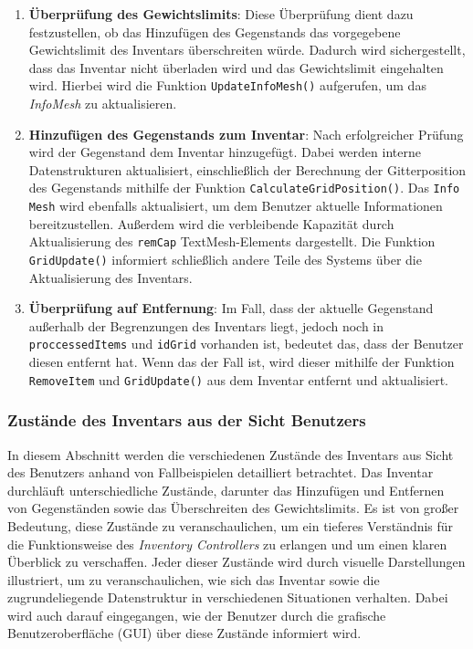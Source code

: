 \begin{enumerate}
    \item \textbf{Überprüfung des Gewichtslimits}:
    Diese Überprüfung dient dazu festzustellen, ob das Hinzufügen des Gegenstands das vorgegebene Gewichtslimit des
    Inventars überschreiten würde. Dadurch wird sichergestellt, dass das Inventar nicht überladen wird und das
    Gewichtslimit eingehalten wird. Hierbei wird die Funktion \texttt{UpdateInfoMesh()} aufgerufen, um das \textit{InfoMesh}
    zu aktualisieren.

    \item \textbf{Hinzufügen des Gegenstands zum Inventar}:
    Nach erfolgreicher Prüfung wird der Gegenstand dem Inventar hinzugefügt. Dabei werden interne Datenstrukturen
    aktualisiert, einschließlich der Berechnung der Gitterposition des Gegenstands mithilfe der Funktion
    \texttt{CalculateGridPosition()}. Das \texttt{Info Mesh} wird ebenfalls aktualisiert, um dem Benutzer aktuelle
    Informationen bereitzustellen. Außerdem wird die verbleibende Kapazität durch Aktualisierung des \texttt{remCap}
    TextMesh-Elements dargestellt. Die Funktion \texttt{GridUpdate()} informiert schließlich andere Teile des Systems
    über die Aktualisierung des Inventars.

    \item \textbf{Überprüfung auf Entfernung}:
    Im Fall, dass der aktuelle Gegenstand außerhalb der Begrenzungen des Inventars liegt, jedoch noch in
    \texttt{proccessedItems} und \texttt{idGrid} vorhanden ist, bedeutet das, dass der Benutzer diesen entfernt
    hat. Wenn das der Fall ist, wird dieser mithilfe der Funktion \texttt{RemoveItem} und \texttt{GridUpdate()} aus
    dem Inventar entfernt und aktualisiert.
\end{enumerate}

\subsubsection{Zustände des Inventars aus der Sicht Benutzers}
In diesem Abschnitt werden die verschiedenen Zustände des Inventars aus Sicht des Benutzers anhand von Fallbeispielen
detailliert betrachtet. Das Inventar durchläuft unterschiedliche Zustände, darunter das Hinzufügen und Entfernen
von Gegenständen sowie das Überschreiten des Gewichtslimits. Es ist von großer Bedeutung, diese Zustände zu
veranschaulichen, um ein tieferes Verständnis für die Funktionsweise des \textit{Inventory Controllers} zu erlangen
und um einen klaren Überblick zu verschaffen. Jeder dieser Zustände wird durch visuelle Darstellungen illustriert,
um zu veranschaulichen, wie sich das Inventar sowie die zugrundeliegende Datenstruktur in verschiedenen Situationen
verhalten. Dabei wird auch darauf eingegangen, wie der Benutzer durch die grafische Benutzeroberfläche (GUI) über
diese Zustände informiert wird.

